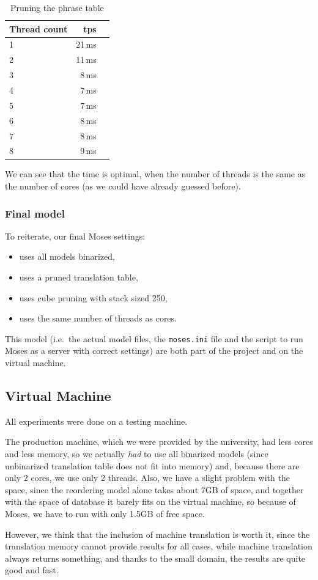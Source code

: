 \begin{table}[h]
\begin{center}
\begin{tabular}{|l|r|r|}
    \hline
    \textbf{Thread count} &  \textbf{tps}  \\ \hline
    1 & 21\,ms \\ \hline
    2 & 11\,ms \\ \hline
    3 & 8\,ms \\ \hline
    4 & 7\,ms \\ \hline
    5 & 7\,ms \\ \hline
    6 & 8\,ms \\ \hline
    7 & 8\,ms \\ \hline
    8 & 9\,ms \\ \hline
    
\end{tabular}
\end{center}
\caption{Pruning the phrase table}\label{moses:tablethread}
\end{table}


We can see that the time is optimal, when the number of threads is the same as the number of cores (as we could have already guessed before).

\subsubsection*{Final model}
To reiterate, our final Moses settings:

\begin{itemize}
    \item uses all models binarized,
    \item uses a pruned translation table,
    \item uses cube pruning with stack sized 250,
    \item uses the same number of threads as cores.
\end{itemize}

This model (i.e.\ the actual model files, the \texttt{moses.ini} file and the script to run Moses as a server with correct settings) are both part of the project and on the virtual machine.

\subsection{Virtual Machine}
All experiments were done on a testing machine.

The production machine, which we were provided by the university, had less cores and less memory, so we actually \emph{had} to use all binarized models (since unbinarized translation table does not fit into memory) and, because there are only 2 cores, we use only 2 threads. Also, we have a slight problem with the space, since the reordering model alone takes about 7GB of space, and together with the space of database it barely fits on the virtual machine, so because of Moses, we have to run with only 1.5GB of free space.

However, we think that the inclusion of machine translation is worth it, since the translation memory cannot provide results for all cases, while machine translation always returns something, and thanks to the small domain, the results are quite good and fast.
